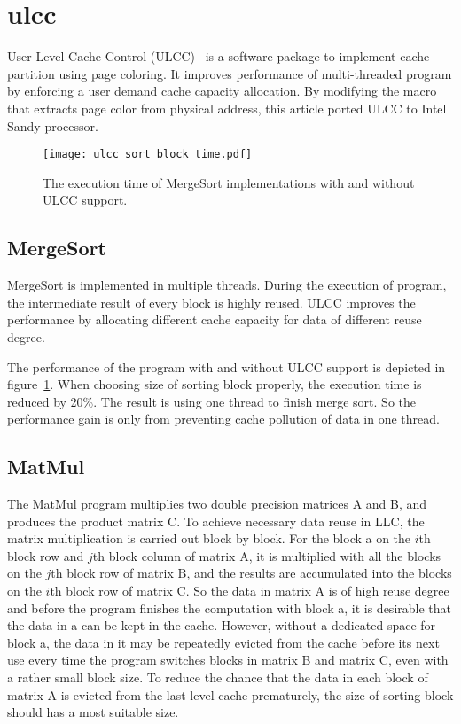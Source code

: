 \documentclass[conference]{IEEEtran}
\begin{document}
\section{ulcc}
User Level Cache Control (ULCC)~\cite{ding2011ulcc} is a software package to implement cache partition using page coloring. It improves performance of multi-threaded program by enforcing a user demand cache capacity allocation. By modifying the macro that extracts page color from physical address, this article ported ULCC to Intel Sandy processor.
\begin{figure}[!htbp]
\centering
\texttt{[image: ulcc\_sort\_block\_time.pdf]}
\caption{The execution time of MergeSort implementations with and without ULCC support.}
\label{fig:ULCCSortBlockTime}
\end{figure}
\subsection{MergeSort}
MergeSort is implemented in multiple threads. During the execution of program, the intermediate result of every block is highly reused. ULCC improves the performance by allocating different cache capacity for data of different reuse degree.

The performance of the program with and without ULCC support is depicted in figure~\ref{fig:ULCCSortBlockTime}. When choosing size of sorting block properly, the execution time is reduced by 20\%. The result is using one thread to finish merge sort. So the performance gain is only from preventing cache pollution of data in one thread.
\subsection{MatMul}
The MatMul program multiplies two double precision matrices A and B, and produces the product matrix C. To achieve necessary data reuse in LLC, the matrix multiplication is carried out block by block. For the block a on the $i$th block row and $j$th block column of matrix A, it is multiplied with all the blocks on the $j$th block row of matrix B, and the results are accumulated into the blocks on the $i$th block row of matrix C. So the data in matrix A is of high reuse degree and before the program finishes the computation with block a, it is desirable that the data in a can be kept in the cache. However, without a dedicated space for block a, the data in it may be repeatedly evicted from the cache before its next use every time the program switches blocks in matrix B and matrix C, even with a rather small block size. To reduce the chance that the data in each block of matrix A is evicted from the last level cache prematurely, the size of sorting block should has a most suitable size.
\end{document}

